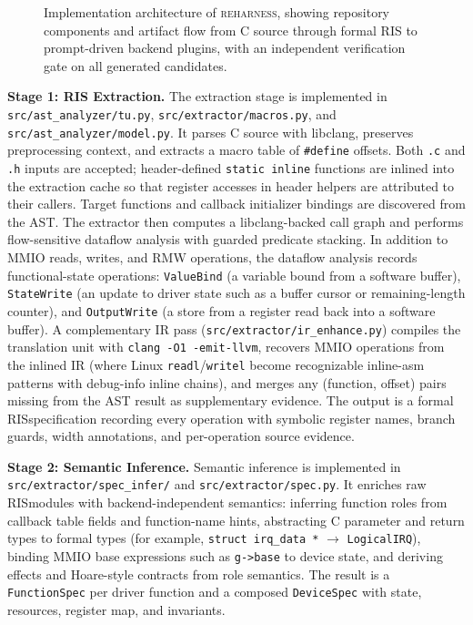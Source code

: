 \documentclass[sigplan, screen, review, anonymous]{acmart}
\newcommand{\reharness}{\textsc{reharness}}
\newcommand{\rislang}{RIS}
\begin{document}
\begin{figure}[t]
{%
}
\caption{Implementation architecture of \reharness, showing repository components and artifact flow from C source through formal RIS to prompt-driven backend plugins, with an independent verification gate on all generated candidates.}
\label{fig:impl_arch}
\end{figure}

\textbf{Stage 1: RIS Extraction.} The extraction stage is implemented in \texttt{src/ast\_analyzer/tu.py}, \texttt{src/extractor/macros.py}, and \texttt{src/ast\_analyzer/model.py}. It parses C source with libclang, preserves preprocessing context, and extracts a macro table of \texttt{\#define} offsets. Both \texttt{.c} and \texttt{.h} inputs are accepted; header-defined \texttt{static inline} functions are inlined into the extraction cache so that register accesses in header helpers are attributed to their callers. Target functions and callback initializer bindings are discovered from the AST. The extractor then computes a libclang-backed call graph and performs flow-sensitive dataflow analysis with guarded predicate stacking. In addition to MMIO reads, writes, and RMW operations, the dataflow analysis records functional-state operations: \texttt{ValueBind} (a variable bound from a software buffer), \texttt{StateWrite} (an update to driver state such as a buffer cursor or remaining-length counter), and \texttt{OutputWrite} (a store from a register read back into a software buffer). A complementary IR pass (\texttt{src/extractor/ir\_enhance.py}) compiles the translation unit with \texttt{clang -O1 -emit-llvm}, recovers MMIO operations from the inlined IR (where Linux \texttt{readl}/\texttt{writel} become recognizable inline-asm patterns with debug-info inline chains), and merges any (function, offset) pairs missing from the AST result as supplementary evidence. The output is a formal \rislang specification recording every operation with symbolic register names, branch guards, width annotations, and per-operation source evidence.

\textbf{Stage 2: Semantic Inference.} Semantic inference is implemented in \texttt{src/extractor/spec\_infer/} and \texttt{src/extractor/spec.py}. It enriches raw \rislang modules with backend-independent semantics: inferring function roles from callback table fields and function-name hints, abstracting C parameter and return types to formal types (for example, \texttt{struct irq\_data *} $\rightarrow$ \texttt{LogicalIRQ}), binding MMIO base expressions such as \texttt{g->base} to device state, and deriving effects and Hoare-style contracts from role semantics. The result is a \texttt{FunctionSpec} per driver function and a composed \texttt{DeviceSpec} with state, resources, register map, and invariants.
\end{document}
